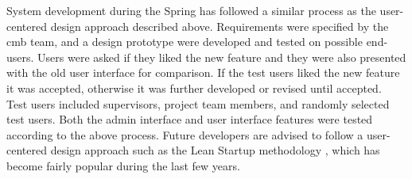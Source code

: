 System development during the Spring has followed a similar process as the user-centered design approach described above. Requirements were specified by the \gls{cmb} team, and a design prototype were developed and tested on possible end-users. Users were asked if they liked the new feature and they were also presented with the old user interface for comparison. If the test users liked the new feature it was accepted, otherwise it was further developed or revised until accepted. \\

Test users included supervisors, project team members, and randomly selected test users. Both the admin interface and user interface features were tested according to the above process. Future developers are advised to follow a user-centered design approach such as the Lean Startup methodology \cite{ries2011}, which has become fairly popular during the last few years.




